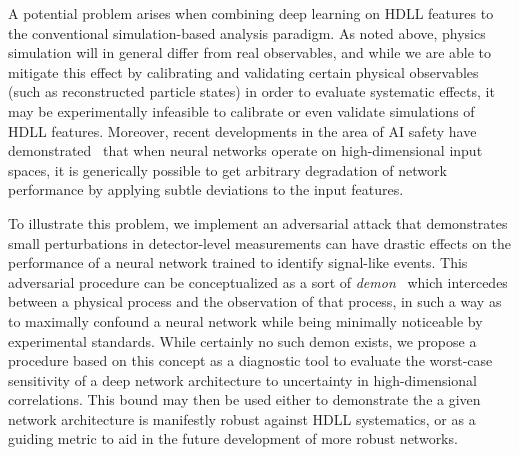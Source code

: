 \documentclass[reprint,nofootinbib,...]{revtex4-1}
\begin{document}

A potential problem arises when combining deep learning on HDLL features to the conventional simulation-based analysis paradigm.
As noted above, physics simulation will in general differ from real observables, and while we are able to mitigate this effect by calibrating and validating certain physical observables (such as reconstructed particle states) in order to evaluate systematic effects, it may be experimentally infeasible to calibrate or even validate simulations of HDLL features.
Moreover, recent developments in the area of AI safety have demonstrated~\cite{Szegedy14intriguingproperties,DBLP:journals/corr/GoodfellowSS14} that when neural networks operate on high-dimensional input spaces, it is generically possible to get arbitrary degradation of network performance by applying subtle deviations to the input features.



To illustrate this problem, we implement an adversarial attack that demonstrates small perturbations in detector-level measurements can have drastic effects on the performance of a neural network trained to identify signal-like events.
This adversarial procedure can be conceptualized as a sort of \textit{demon}~\cite{TheLordKelvin} which intercedes between a physical process and the observation of that process, in such a way as to maximally confound a neural network while being minimally noticeable by experimental standards.
While certainly no such demon exists, we propose a procedure based on this concept as a diagnostic tool to evaluate the worst-case sensitivity of a deep network architecture to uncertainty in high-dimensional correlations.
This bound may then be used either to demonstrate the a given network architecture is manifestly robust against HDLL systematics, or as a guiding metric to aid in the future development of more robust networks.
\end{document}
